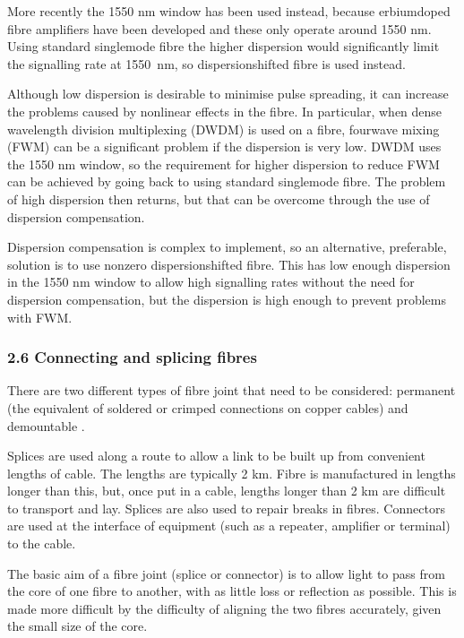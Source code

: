 \documentclass[letterpaper,10pt,english]{sphinxmanual}
\begin{document}
More recently the 1550 nm window has been used instead, because erbium\sphinxhyphen{}doped fibre amplifiers have been developed and these only operate around 1550 nm. Using standard single\sphinxhyphen{}mode fibre the higher dispersion would significantly limit the signalling rate at 1550 nm, so dispersion\sphinxhyphen{}shifted fibre is used instead.

Although low dispersion is desirable to minimise pulse spreading, it can increase the problems caused by non\sphinxhyphen{}linear effects in the fibre. In particular, when dense wavelength division multiplexing (DWDM) is used on a fibre, four\sphinxhyphen{}wave mixing (FWM) can be a significant problem if the dispersion is very low. DWDM uses the 1550 nm window, so the requirement for higher dispersion to reduce FWM can be achieved by going back to using standard single\sphinxhyphen{}mode fibre. The problem of high dispersion then
returns, but that can be overcome through the use of dispersion compensation.

Dispersion compensation is complex to implement, so an alternative, preferable, solution is to use non\sphinxhyphen{}zero dispersion\sphinxhyphen{}shifted fibre. This has low enough dispersion in the 1550 nm window to allow high signalling rates without the need for dispersion compensation, but the dispersion is high enough to prevent problems with FWM.


\subsubsection{2.6 Connecting and splicing fibres}
\label{\detokenize{content/session_00/Part_00_02:2.6-Connecting-and-splicing-fibres}}
There are two different types of fibre joint that need to be considered: permanent  (the equivalent of soldered or crimped connections on copper cables) and demountable .

Splices are used along a route to allow a link to be built up from convenient lengths of cable. The lengths are typically 2 km. Fibre is manufactured in lengths longer than this, but, once put in a cable, lengths longer than 2 km are difficult to transport and lay. Splices are also used to repair breaks in fibres. Connectors are used at the interface of equipment (such as a repeater, amplifier or terminal) to the cable.

The basic aim of a fibre joint (splice or connector) is to allow light to pass from the core of one fibre to another, with as little loss or reflection as possible. This is made more difficult by the difficulty of aligning the two fibres accurately, given the small size of the core.
\end{document}
